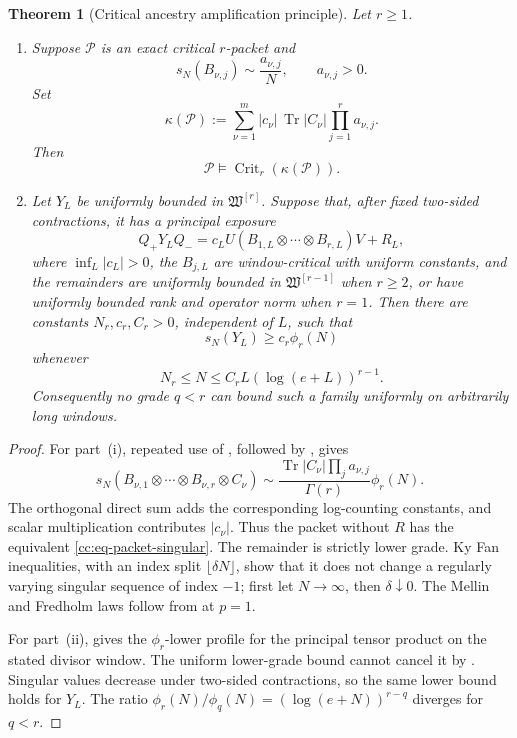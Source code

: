 \documentclass[10pt,reqno]{amsart}
\theoremstyle{plain}
\newtheorem{theorem}{Theorem}[section]
\theoremstyle{definition}
\theoremstyle{remark}
\begin{document}
\begin{theorem}[Critical ancestry amplification principle]
\label{cc:thm-critical-packet-principle}
Let \(r\ge1\).

\begin{enumerate}[label=\textup{(\roman*)},leftmargin=2.8em]
\item Suppose \(\mathcal P\) is an exact critical \(r\)-packet and
\[
 s_N(B_{\nu,j})\sim \frac{a_{\nu,j}}N,
 \qquad a_{\nu,j}>0.
\]
Set
\begin{equation}
 \kappa(\mathcal P)
 :=\sum_{\nu=1}^m |c_\nu|\,\operatorname{Tr}|C_\nu|
       \prod_{j=1}^r a_{\nu,j}.
 \label{cc:eq-packet-amplitude}
\end{equation}
Then
\[
 \mathcal P\models\operatorname{Crit}_r(\kappa(\mathcal P)).
\]

\item Let \(Y_L\) be uniformly bounded in \(\mathfrak W^{[r]}\).  Suppose
that, after fixed two-sided contractions, it has a principal exposure
\[
 Q_+Y_LQ_-=c_LU
 (B_{1,L}\otimes\cdots\otimes B_{r,L})V+R_L,
\]
where \(\inf_L|c_L|>0\), the \(B_{j,L}\) are window-critical with uniform
constants, and the remainders are uniformly bounded in
\(\mathfrak W^{[r-1]}\) when \(r\ge2\), or have uniformly bounded rank and
operator norm when \(r=1\).  Then there are constants
\(N_r,c_r,C_r>0\), independent of \(L\), such that
\begin{equation}
 s_N(Y_L)\ge c_r\phi_r(N)
 \label{cc:eq-window-exposure-lower}
\end{equation}
whenever
\[
 N_r\le N\le C_rL(\log(e+L))^{r-1}.
\]
Consequently no grade \(q<r\) can bound such a family uniformly on
arbitrarily long windows.
\end{enumerate}
\end{theorem}

\begin{proof}
For part~\textup{(i)}, repeated use of
, followed by
, gives
\[
 s_N(B_{\nu,1}\otimes\cdots\otimes B_{\nu,r}\otimes C_\nu)
 \sim\frac{\operatorname{Tr}|C_\nu|\prod_ja_{\nu,j}}{\Gamma(r)}
 \phi_r(N).
\]
The orthogonal direct sum adds the corresponding log-counting constants,
and scalar multiplication contributes \(|c_\nu|\).  Thus the packet without
\(R\) has the equivalent \eqref{cc:eq-packet-singular}.  The remainder is
strictly lower grade.  Ky Fan inequalities, with an index split
\(\lfloor\delta N\rfloor\), show that it does not change a regularly varying
singular sequence of index \(-1\); first let \(N\to\infty\), then
\(\delta\downarrow0\).  The Mellin and Fredholm laws follow from
 at \(p=1\).

For part~\textup{(ii)},
 gives the \(\phi_r\)-lower profile for the
principal tensor product on the stated divisor window.  The uniform
lower-grade bound cannot cancel it by
.  Singular values decrease
under two-sided contractions, so the same lower bound holds for \(Y_L\).
The ratio \(\phi_r(N)/\phi_q(N)=(\log(e+N))^{r-q}\) diverges for \(q<r\).
\end{proof}
\end{document}
